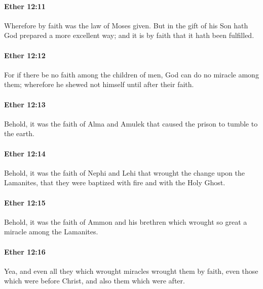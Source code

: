 		\paragraph{Ether 12:11} %
			\label{ETHER-12-11}

			Wherefore by faith was the law of Moses given.
			But in the gift of his Son hath God prepared a more excellent way;
			and it is by faith that it hath been fulfilled.

		\paragraph{Ether 12:12} %
			\label{ETHER-12-12}

			For if there be no faith among the children of men,
			God can do no miracle among them;
			wherefore he shewed not himself until after their faith.

		\paragraph{Ether 12:13} %
			\label{ETHER-12-13}

			Behold, it was the faith of Alma and Amulek
			that caused the prison to tumble to the earth.

		\paragraph{Ether 12:14} %
			\label{ETHER-12-14}

			Behold, it was the faith of Nephi and Lehi
			that wrought the change upon the Lamanites,
			that they were baptized with fire and with the Holy Ghost.

		\paragraph{Ether 12:15} %
			\label{ETHER-12-15}

			Behold, it was the faith of Ammon and his brethren
			which wrought so great a miracle among the Lamanites.

		\paragraph{Ether 12:16} %
			\label{ETHER-12-16}

			Yea, and even all they which wrought miracles wrought them by faith,
			even those which were before Christ,
			and also them which were after.

